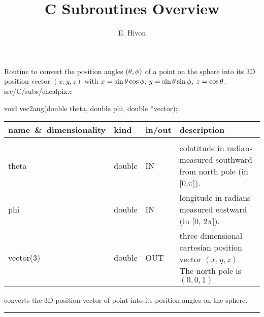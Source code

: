 

\sloppy


\title{\healpix C Subroutines Overview}
 \section[ang2vec]{ }
\label{csub:ang2vec}
\author{E. Hivon}

\begin{facility}
{Routine to convert the position angles $(\theta,\phi)$ of a point on the sphere 
into its 3D position vector $(x,y,z)$ with
$x = \sin\theta\cos\phi$, $y=\sin\theta\sin\phi$, $z=\cos\theta$. 
}
{src/C/subs/chealpix.c}
\end{facility}

\begin{Cfunction}
{void vec2ang(double theta, double phi, double *vector);}
\end{Cfunction}

\begin{arguments}
{
\begin{tabular}{p{0.3\hsize} p{0.10\hsize} p{0.05\hsize} p{0.45\hsize}} \hline  
\textbf{name~\&~dimensionality} & \textbf{kind} & \textbf{in/out} & \textbf{description} \\ \hline
                   &   &   &                           \\ %
theta & double & IN & colatitude in radians measured southward from north pole (in
    [0,$\pi$]). \\
phi   & double & IN & longitude in radians measured eastward (in [0, $2\pi$]).\\
vector(3) & double & OUT & three dimensional cartesian position vector
                   $(x,y,z)$. The north pole is $(0,0,1)$\\
\end{tabular}
}
\end{arguments}



\begin{related}
  \begin{sulist}{} %
  \item[\htmlref{vec2ang}{csub:vec2ang}] converts the 3D position vector of point into its position
  angles on the sphere.
  \end{sulist}
\end{related}

\rule{\hsize}{2mm}

